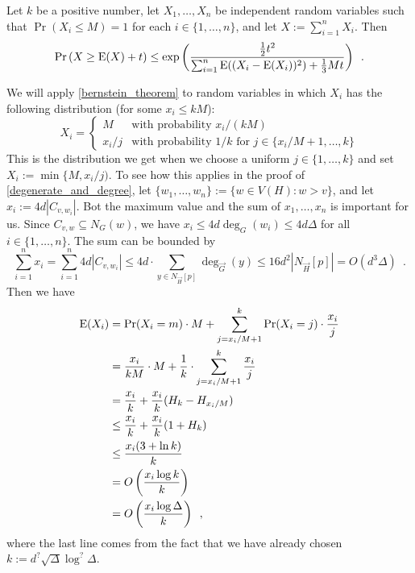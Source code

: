 \documentclass{patmorin}
\begin{document}
\begin{thm}\label{bernstein_theorem}
  Let $k$ be a positive number, let $X_1,\ldots,X_n$ be independent random variables such that $\Pr(X_i\le M)=1$ for each $i\in\{1,\ldots,n\}$, and let $X:=\sum_{i=1}^n X_i$. Then
  \begin{equation}
    \Pr\left(X \ge \mathrm{E}(X)+ t\right)
      \le \exp\left(\frac{\tfrac{1}{2}t^2}{\sum_{i=1}^n \mathrm{E}((X_i-\mathrm{E}(X_i))^2)+\tfrac{1}{3}Mt}\right) \enspace . \label{bernstein}
  \end{equation}
\end{thm}
We will apply \cref{bernstein_theorem} to random variables in which $X_i$ has the following distribution (for some $x_i\le kM$):
\[
  X_i = \begin{cases}
          M & \text{with probability $x_i/(kM)$} \\
          x_i/j & \text{with probability $1/k$ for $j\in\{x_i/M+1,\ldots,k\}$}
        \end{cases}
\]
This is the distribution we get when we choose a uniform $j\in\{1,\ldots,k\}$ and set $X_i:=\min\{M,x_i/j)$.  To see how this applies in the proof of \cref{degenerate_and_degree}, let $\{w_1,\ldots,w_n\}:=\{w\in V(H):w>v\}$, and let $x_i:=4d|C_{v,w_i}|$.  Bot the maximum value and the sum of $x_1,\ldots,x_n$ is important for us.  Since $C_{v,w}\subseteq N_G(w)$, we have $x_i\le 4d\deg_G(w_i)\le 4d\Delta$ for all $i\in\{1,\ldots,n\}$. The sum can be bounded by
\[
  \sum_{i=1}^n x_i
    = \sum_{i=1}^n 4d|C_{v,w_i}|
    \le 4d\cdot \sum_{y\in N_{\overrightarrow{H}}[p]} \deg_{\overrightarrow{G}}(y)
    \le 16d^2|N_{\overrightarrow{H}}[p]|=O(d^3\Delta)
  \enspace .
\]
Then we have
\begin{align*}
  \mathrm{E}(X_i)
  & =\Pr(X_i=m)\cdot M + \sum_{j=x_i/M+1}^k \Pr(X_i=j)\cdot\frac{x_i}{j} \\
  & =\frac{x_i}{kM}\cdot M + \frac{1}{k}\cdot\sum_{j=x_i/M+1}^k \frac{x_i}{j} \\
  & = \frac{x_i}{k} + \frac{x_i}{k}(H_{k}-H_{x_i/M}) \\
  & \le \frac{x_i}{k} + \frac{x_i}{k}(1+H_{k}) \\
  & \le \frac{x_i(3+\ln k)}{k} \\
  & = O\left(\frac{x_i\log k}{k}\right) \\
  & = O\left(\frac{x_i\log \Delta}{k}\right)
  \enspace ,
\end{align*}
where the last line comes from the fact that we have already chosen $k:=d^?\sqrt{\Delta}\log^{?}\Delta$.
\end{document}
